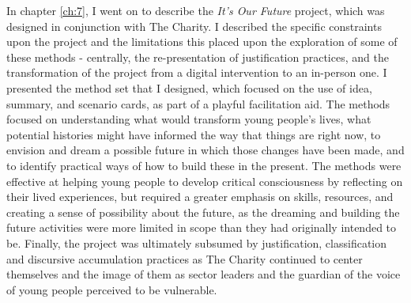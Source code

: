 In chapter \ref{ch:7}, I went on to describe the \textit{It's Our Future} project, which was designed in conjunction with The Charity. I described the specific constraints upon the project and the limitations this placed upon the exploration of some of these methods - centrally, the re-presentation of justification practices, and the transformation of the project from a digital intervention to an in-person one. I presented the method set that I designed, which focused on the use of idea, summary, and scenario cards, as part of a playful facilitation aid. The methods focused on understanding what would transform young people's lives,  what potential histories might have informed the way that things are right now, to envision and dream a possible future in which those changes have been made, and to identify practical ways of how to build these in the present. The methods were effective at helping young people to develop critical consciousness by reflecting on their lived experiences, but required a greater emphasis on skills, resources, and  creating a sense of possibility about the future, as the dreaming and building the future activities were more limited in scope than they had originally intended to be. Finally, the project was ultimately subsumed by justification, classification and discursive accumulation practices as The Charity continued to center themselves and the image of them as sector leaders and the guardian of the voice of young people perceived to be vulnerable.

